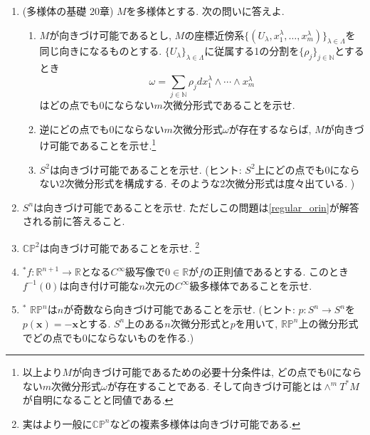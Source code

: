 \documentclass[dvipdfmx,a4paper,11pt]{article}
\newcommand{\R}{\mathbb{R}}
\newcommand{\N}{\mathbb{N}}
\newcommand{\C}{\mathbb{C}}
\theoremstyle{definition}
\begin{document}
\begin{enumerate}[label=\textbf{問}\ref*{sec-stokes}.\arabic*]
\newpage
\item \label{nform} (多様体の基礎 20章)
 $M$を多様体とする. 次の問いに答えよ. 
\begin{enumerate}
  \setlength{\parskip}{0cm}
  \setlength{\itemsep}{2pt} 
 \item $M$が向きづけ可能であるとし, $M$の座標近傍系$\{ (U_{\lambda}, x_{1}^{\lambda}, \ldots, x_{m}^{\lambda})\}_{\lambda \in \Lambda}$を同じ向きになるものとする. $\{U_{\lambda}\}_{\lambda \in \Lambda}$に従属する1の分割を$\{ \rho_{j} \}_{j \in \N}$とするとき
 $$
 \omega = \sum_{j \in\N} \rho_j dx_{1}^{\lambda} \wedge \cdots \wedge x_{m}^{\lambda}
 $$
 はどの点でも0にならない$m$次微分形式であることを示せ. 
 \item 逆にどの点でも0にならない$m$次微分形式$\omega$が存在するならば, $M$が向きづけ可能であることを示せ.\footnote{以上より$M$が向きづけ可能であるための必要十分条件は, どの点でも0にならない$m$次微分形式$\omega$が存在することである. そして向きづけ可能とは$\wedge^{m}T^{*}M$が自明になることと同値である.}
\item $S^2$は向きづけ可能であることを示せ. (ヒント: $S^2$上にどの点でも0にならない$2$次微分形式を構成する. そのような2次微分形式は度々出ている. )
 \end{enumerate}





\item $S^n$は向きづけ可能であることを示せ. ただしこの問題は\ref{regular_orin}が解答される前に答えること. 

\item $\C\mathbb{P}^2$は向きづけ可能であることを示せ. \footnote{実はより一般に$\C \mathbb{P}^n$などの複素多様体は向きづけ可能である.}

\item $^*$\label{regular_orin}$f : \R^{n+1} \rightarrow \R$となる$C^{\infty}$級写像で$0 \in \R$が$f$の正則値であるとする. このとき$f^{-1}(0)$は向き付け可能な$n$次元の$C^{\infty}$級多様体であることを示せ. 

\item $^{*}$ $\R \mathbb{P}^n$は$n$が奇数なら向きづけ可能であることを示せ. (ヒント: $p : S^n \to S^n$を$p(\bm{x})=-\bm{x}$とする. $S^n$上のある$n$次微分形式と$p$を用いて, $\R \mathbb{P}^n$上の微分形式でどの点でも0にならないものを作る.)


\end{enumerate}
\end{document}
